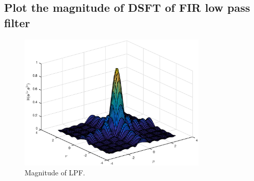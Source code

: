 \documentclass{article}
\begin{document}
\subsection{Plot the magnitude of DSFT of FIR low pass filter}
\begin{figure}[h]
\begin{center}
\includegraphics[width=0.8\textwidth]{lpfcsft}
\caption{Magnitude of LPF.}
\end{center}
\end{figure}
\end{document}
